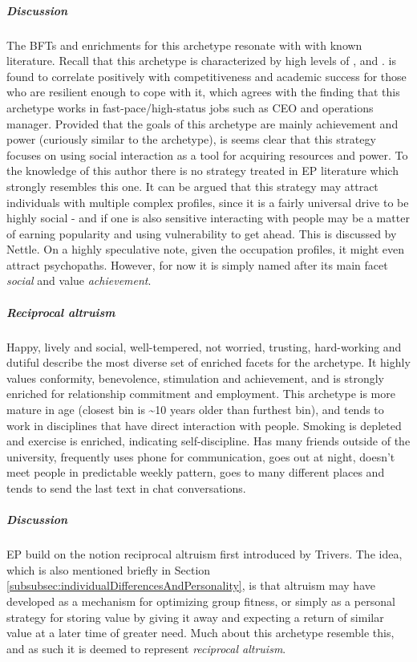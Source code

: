 	\subparagraph{\textnormal{\textit{Discussion}}}
	The BFTs and enrichments for this archetype resonate with with known literature.
	Recall that this archetype is characterized by high levels of \OPE, \EXT and \NEU.
	\NEU is found to correlate positively with competitiveness and academic success for those who are resilient enough to cope with it, which agrees with the finding that this archetype works in fast-pace/high-status jobs such as CEO and operations manager.
	Provided that the goals of this archetype are mainly achievement and power (curiously similar to the \achiever archetype), is seems clear that this strategy focuses on using social interaction as a tool for acquiring resources and power.
	To the knowledge of this author there is no strategy treated in EP literature which strongly resembles this one.
	It can be argued that this strategy may attract individuals with multiple complex profiles, since it is a fairly universal drive to be highly social - and if one is also sensitive interacting with people may be a matter of earning popularity and using vulnerability to get ahead. This is discussed by Nettle.
	On a highly speculative note, given the occupation profiles, it might even attract psychopaths.
	However, for now it is simply named after its main facet \textit{social} and value \textit{achievement}.


\subparagraph*{Reciprocal altruism}
Happy, lively and social, well-tempered, not worried, trusting, hard-working and dutiful describe the most diverse set of enriched facets for the \wildcard archetype.
It highly values conformity, benevolence, stimulation and achievement, and is strongly enriched for relationship commitment and employment.
This archetype is more mature in age (closest bin is \textasciitilde10 years older than furthest bin), and tends to work in disciplines that have direct interaction with people.
Smoking is depleted and exercise is enriched, indicating self-discipline.
Has many friends outside of the university, frequently uses phone for communication, goes out at night, doesn't meet people in predictable weekly pattern, goes to many different places and tends to send the last text in chat conversations.

	\subparagraph{\textnormal{\textit{Discussion}}}
	EP build on the notion reciprocal altruism first introduced by Trivers. The idea, which is also mentioned briefly in Section \ref{subsubsec:individualDifferencesAndPersonality}, is that altruism may have developed as a mechanism for optimizing group fitness, or simply as a personal strategy for storing value by giving it away and expecting a return of similar value at a later time of greater need. Much about this archetype resemble this, and as such it is deemed to represent \textit{reciprocal altruism}.

